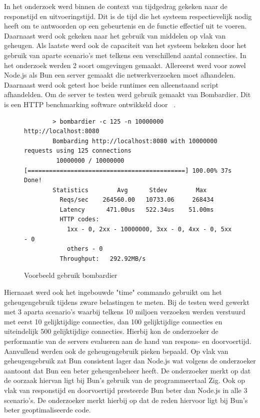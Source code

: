 In het onderzoek werd binnen de context van tijdgedrag gekeken naar de responstijd en uitvoeringstijd. 
Dit is de tijd die het systeem respectievelijk nodig heeft om te antwoorden op een gebeurtenis en de functie effectief uit te voeren.
Daarnaast werd ook gekeken naar het gebruik van middelen op vlak van geheugen.
Als laatste werd ook de capaciteit van het systeem bekeken door het gebruik van aparte scenario's met telkens een verschillend aantal connecties.
In het onderzoek werden 2 soort omgevingen gemaakt. Allereerst werd voor zowel Node.js als Bun een server gemaakt die netwerkverzoeken moet afhandelen.
Daarnaast werd ook getest hoe beide runtimes een alleenstaand script afhandelden.
Om de server te testen werd gebruik gemaakt van Bombardier. Dit is een HTTP benchmarking software ontwikkeld door ~\textcite{Fedoseev2023}.
\begin{figure}[H]
    \centering
    \begin{verbatim}
        > bombardier -c 125 -n 10000000 http://localhost:8080
        Bombarding http://localhost:8080 with 10000000 requests using 125 connections
         10000000 / 10000000 [============================================] 100.00% 37s Done!
        Statistics        Avg      Stdev        Max
          Reqs/sec    264560.00   10733.06     268434
          Latency      471.00us   522.34us    51.00ms
          HTTP codes:
            1xx - 0, 2xx - 10000000, 3xx - 0, 4xx - 0, 5xx - 0
            others - 0
          Throughput:   292.92MB/s
        \end{verbatim}
        \caption{Voorbeeld gebruik bombardier \autocite{Fedoseev2023}}
\end{figure}
Hiernaast werd ook het ingebouwde "time" commando gebruikt om het geheugengebruik tijdens zware belastingen te meten.
Bij de testen werd gewerkt met 3 aparta scenario's waarbij telkens 10 miljoen verzoeken werden verstuurd met eerst 10 gelijktijdige connecties, 
dan 100 gelijktijdige connecties en uiteindelijk 500 gelijktijdige connecties.
Hierbij kon de onderzoeker de performantie van de servers evalueren aan de hand van respons- en doorvoertijd. Aanvullend werden ook de geheugengebruik pieken bepaald.
Op vlak van geheugengebruik zat Bun consistent lager dan Node.js wat volgens de onderzoeker aantoont dat Bun een beter geheugenbeheer heeft. 
De onderzoeker merkt op dat de oorzaak hiervan ligt bij Bun's gebruik van de programmeertaal Zig. 
Ook op vlak van responstijd en doorvoertijd presteerde Bun beter dan Node.js in alle 3 scenario's.
De onderzoeker merkt hierbij op dat de reden hiervoor ligt bij Bun's beter geoptimaliseerde code.


